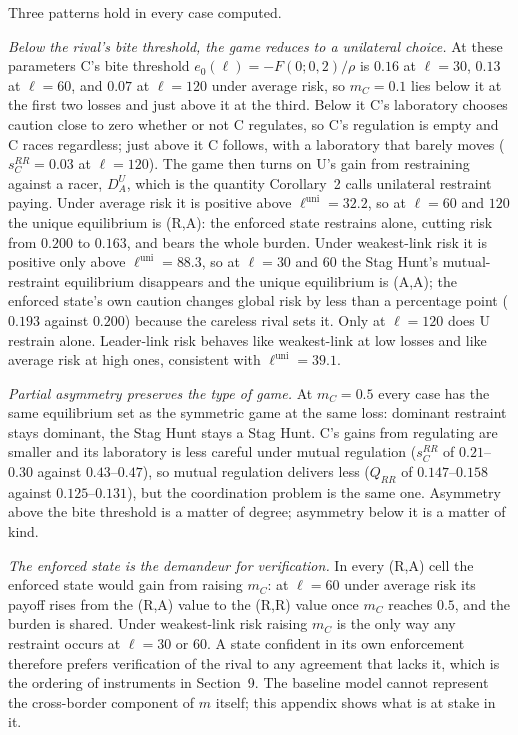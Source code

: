 \documentclass[11pt]{article}
\theoremstyle{plain}
\theoremstyle{definition}
\theoremstyle{remark}
\begin{document}
Three patterns hold in every case computed.

\emph{Below the rival's bite threshold, the game reduces to a unilateral choice.} At these parameters C's bite threshold $e_0(\ell)=-F(0;0,2)/\rho$ is $0.16$ at $\ell=30$, $0.13$ at $\ell=60$, and $0.07$ at $\ell=120$ under average risk, so $m_C=0.1$ lies below it at the first two losses and just above it at the third. Below it C's laboratory chooses caution close to zero whether or not C regulates, so C's regulation is empty and C races regardless; just above it C follows, with a laboratory that barely moves ($s^{RR}_C=0.03$ at $\ell=120$). The game then turns on U's gain from restraining against a racer, $D^U_A$, which is the quantity Corollary~2 calls unilateral restraint paying. Under average risk it is positive above $\ell^{\mathrm{uni}}=32.2$, so at $\ell=60$ and $120$ the unique equilibrium is (R,A): the enforced state restrains alone, cutting risk from $0.200$ to $0.163$, and bears the whole burden. Under weakest-link risk it is positive only above $\ell^{\mathrm{uni}}=88.3$, so at $\ell=30$ and $60$ the Stag Hunt's mutual-restraint equilibrium disappears and the unique equilibrium is (A,A); the enforced state's own caution changes global risk by less than a percentage point ($0.193$ against $0.200$) because the careless rival sets it. Only at $\ell=120$ does U restrain alone. Leader-link risk behaves like weakest-link at low losses and like average risk at high ones, consistent with $\ell^{\mathrm{uni}}=39.1$.

\emph{Partial asymmetry preserves the type of game.} At $m_C=0.5$ every case has the same equilibrium set as the symmetric game at the same loss: dominant restraint stays dominant, the Stag Hunt stays a Stag Hunt. C's gains from regulating are smaller and its laboratory is less careful under mutual regulation ($s^{RR}_C$ of $0.21$--$0.30$ against $0.43$--$0.47$), so mutual regulation delivers less ($Q_{RR}$ of $0.147$--$0.158$ against $0.125$--$0.131$), but the coordination problem is the same one. Asymmetry above the bite threshold is a matter of degree; asymmetry below it is a matter of kind.

\emph{The enforced state is the demandeur for verification.} In every (R,A) cell the enforced state would gain from raising $m_C$: at $\ell=60$ under average risk its payoff rises from the (R,A) value to the (R,R) value once $m_C$ reaches $0.5$, and the burden is shared. Under weakest-link risk raising $m_C$ is the only way any restraint occurs at $\ell=30$ or $60$. A state confident in its own enforcement therefore prefers verification of the rival to any agreement that lacks it, which is the ordering of instruments in Section~9. The baseline model cannot represent the cross-border component of $m$ itself; this appendix shows what is at stake in it.
\end{document}
